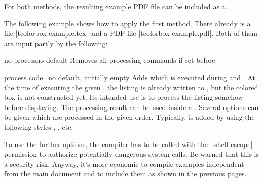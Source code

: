For both methods, the resulting example PDF file can be included
as a .

The following example shows how to apply the first method.
There already is a file |tcolorbox-example.tex| and a PDF file
|tcolorbox-example.pdf|. Both of them are input partly by the following:

\begin{dispListing}
\end{dispListing}
{\tcbusetemp}


\clearpage


\begin{docTcbKey}[][doc new=2014-11-14]{no process}{}{no default}
  Removes all processing commands if set before.
\end{docTcbKey}

\begin{docTcbKey}[][doc new=2014-11-14]{process code}{=}{no default, initially empty}
  Adds  which is executed during 
  and . At the time of executing the given ,
  the listing is already written to , but
  the colored box is not constructed yet.
  Its intended use is to process the listing somehow before displaying.
  The processing result can be used inside a .
  Several  options can be given which are
  processed in the given order.
  Typically,  is added by using the following styles
  , , etc.
\end{docTcbKey}

\begin{marker}
To use the further options, the compiler has to be called with the
|-shell-escape| permission to authorize potentially dangerous system calls.
Be warned that this is a security risk. Anyway, it's more economic to
compile examples independent from the main document and to include them as
shown in the previous pages.
\end{marker}

